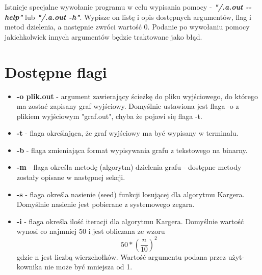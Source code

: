 \documentclass{article}
\begin{document}
Istnieje specjalne wywołanie programu w celu wypisania pomocy - \textbf{\textit{"/.a.out }\textit{-}\textit{-}\textit{help"}} lub \textbf{\textit{"/.a.out -h"}}. Wypisze on listę i opis dostępnych argumentów, flag i metod dzielenia, a następnie zwróci wartość 0. Podanie po wywołaniu pomocy jakichkolwiek innych argumentów będzie traktowane jako błąd.
\section{Dostępne flagi}
\begin{itemize}
    \item \textbf{-o plik.out} - argument zawierający ścieżkę do pliku wyjściowego, do którego ma zostać zapisany graf wyjściowy. Domyślnie ustawiona jest flaga -o z plikiem wyjściowym "graf.out", chyba że pojawi się flaga -t.
    \item \textbf{-t} - flaga określająca, że graf wyjściowy ma być wypisany w terminalu.
    \item \textbf{-b} - flaga zmieniająca format wypisywania grafu z tekstowego na binarny.
    \item \textbf{-m} - flaga określa metodę (algorytm) dzielenia grafu - dostępne metody zostały opisane w następnej sekcji.
    \item \textbf{-s} - flaga określa nasienie (seed) funkcji losującej dla algorytmu Kargera. Domyślnie nasienie jest pobierane z systemowego zegara.
    \item \textbf{-i} - flaga określa ilość iteracji dla algorytmu Kargera. Domyślnie wartość wynosi co najmniej 50 i jest obliczana ze wzoru \[50 * \left(\frac{n}{10}\right)^2\]
    gdzie n jest liczbą wierzchołków. Wartość argumentu podana przez użyt- kownika nie może być mniejsza od 1.
\end{itemize}
\end{document}

